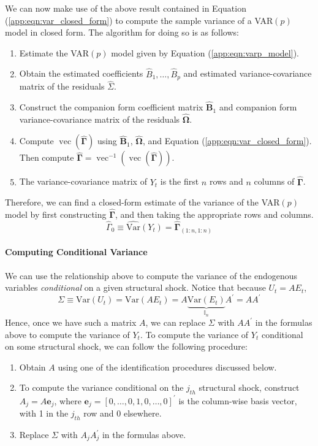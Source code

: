 \documentclass[12pt]{article}
\DeclareMathOperator{\vect}{vec}
\newcommand{\Var}{\mathrm{Var}}
\begin{document}
We can now make use of the above result contained in Equation (\ref{app:eqn:var_closed_form}) to compute the sample variance of a VAR$(p)$ model in closed form. The algorithm for doing so is as follows:
\begin{enumerate}
\item Estimate the VAR$(p)$ model given by Equation (\ref{app:eqn:varp_model}).
\item Obtain the estimated coefficients $\hat B_1, \dots, \hat B_p$ and estimated variance-covariance matrix of the residuals $\hat \Sigma$.
\item Construct the companion form coefficient matrix $\hat{\mathbf{B}}_1$ and companion form variance-covariance matrix of the residuals $\hat{\mathbf{\Omega}}$.
\item Compute $\vect(\hat{\mathbf{\Gamma}})$ using $\hat{\mathbf{B}}_1$, $\hat{\mathbf{\Omega}}$, and Equation (\ref{app:eqn:var_closed_form}). Then compute $\hat{\mathbf{\Gamma}} = \vect^{-1}(\vect(\hat{\mathbf{\Gamma}}))$.
\item The variance-covariance matrix of $Y_t$ is the first $n$ rows and $n$ columns of $\hat{\mathbf{\Gamma}}$.
\end{enumerate}
Therefore, we can find a closed-form estimate of the variance of the VAR$(p)$ model by first constructing $\hat{\mathbf{\Gamma}}$, and then taking the appropriate rows and columns.
\begin{equation}
\hat{\Gamma}_0 \equiv \hat{\Var}(Y_t) = \hat{\mathbf{\Gamma}}_{(1:n, 1:n)}
\end{equation}

\paragraph{Computing Conditional Variance}

We can use the relationship above to compute the variance of the endogenous variables \textit{conditional} on a given structural shock. Notice that because $U_t = A E_t$, 
$$\Sigma \equiv \Var(U_t) = \Var(A E_t) = A\underbrace{\Var(E_t)}_{\mathbb{I}_n}A^\prime = AA^\prime $$
Hence, once we have such a matrix $A$, we can replace $\Sigma$ with $AA^\prime$ in the formulas above to compute the variance of $Y_t$. To compute the variance of $Y_t$ conditional on some structural shock, we can follow the following procedure:
\begin{enumerate}
\item Obtain $A$ using one of the identification procedures discussed below.
\item To compute the variance conditional on the $j_{th}$ structural shock, construct $A_j = A\mathbf{e}_j$, where $\mathbf{e}_j = [0,\dots,0,1,0,\dots,0]^\prime$ is the column-wise basis vector, with 1 in the $j_{th}$ row and 0 elsewhere. 
\item Replace $\Sigma$ with $A_jA_j^\prime$ in the formulas above.
\end{enumerate}
\end{document}
